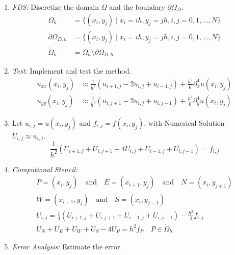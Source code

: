 \begin{enumerate}
  \item \emph{FDS:} Discretize the domain \(\Omega\) and the boundary \(\partial \Omega_D\).
        \begin{align*}
          \Omega_h              & = \{(x_i, y_j) \mid x_i = ih, y_j = jh, i,j = 0,1,\ldots,N\} \\
          \partial \Omega_{D,h} & = \{(x_i, y_j) \mid x_i = ih, y_j = jh, i,j = 0,1,\ldots,N\} \\
          \mathring{\Omega}_h   & = \Omega_h \setminus \partial \Omega_{D,h}
        \end{align*}
  \item \emph{Test:} Implement and test the method.
        \begin{align*}
          u_{xx}(x_i, y_j) & \approx \frac{1}{h^2}(u_{i+1,j} - 2u_{i,j} + u_{i-1,j}) + \frac{h^2}{6}\partial_x^4 u(x_i, y_j) \\
          u_{yy}(x_i, y_j) & \approx \frac{1}{h^2}(u_{i,j+1} - 2u_{i,j} + u_{i,j-1}) + \frac{h^2}{6}\partial_y^4 u(x_i, y_j)
        \end{align*}
  \item Let \(u_{i,j} = u(x_i, y_j)\) and \(f_{i,j} = f(x_i, y_j)\), with Numerical Solution \(U_{i,j} \approx u_{i,j}\).
        \[
          \frac{1}{h^2}\left(U_{i+1,j} + U_{i,j+1} - 4U_{i,j} + U_{i-1,j} + U_{i,j-1}\right) = f_{i,j}
        \]
  \item \emph{Computional Stencil:}
        \begin{align*}
          P = (x_i, y_j) \quad \text{and} \quad E = (x_{i+1}, y_j) \quad \text{and} \quad N = (x_i, y_{j+1})     \\
          W = (x_{i-1}, y_j) \quad \text{and} \quad S = (x_i, y_{j-1})                                           \\
          U_{i,j} = \frac{1}{4}\left(U_{i+1,j} + U_{i,j+1} + U_{i-1,j} + U_{i,j-1}\right) - \frac{h^2}{4}f_{i,j} \\
          U_N + U_E + U_W + U_S - 4U_P = h^2 f_P \quad P \in \mathring{\Omega}_h
        \end{align*}
  \item \emph{Error Analysis:} Estimate the error.
\end{enumerate}
